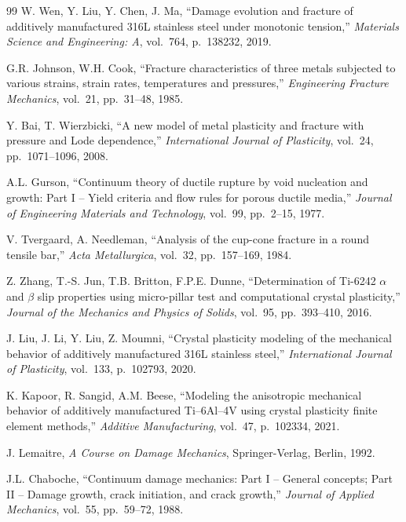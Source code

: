 \documentclass[twocolumn]{sagej}
\begin{document}
\begin{thebibliography}{99}
W. Wen, Y. Liu, Y. Chen, J. Ma, ``Damage evolution and fracture of additively manufactured 316L stainless steel under monotonic tension,'' \textit{Materials Science and Engineering: A}, vol.~764, p.~138232, 2019.

G.R. Johnson, W.H. Cook, ``Fracture characteristics of three metals subjected to various strains, strain rates, temperatures and pressures,'' \textit{Engineering Fracture Mechanics}, vol.~21, pp.~31--48, 1985.

Y. Bai, T. Wierzbicki, ``A new model of metal plasticity and fracture with pressure and Lode dependence,'' \textit{International Journal of Plasticity}, vol.~24, pp.~1071--1096, 2008.

A.L. Gurson, ``Continuum theory of ductile rupture by void nucleation and growth: Part I -- Yield criteria and flow rules for porous ductile media,'' \textit{Journal of Engineering Materials and Technology}, vol.~99, pp.~2--15, 1977.

V. Tvergaard, A. Needleman, ``Analysis of the cup-cone fracture in a round tensile bar,'' \textit{Acta Metallurgica}, vol.~32, pp.~157--169, 1984.

Z. Zhang, T.-S. Jun, T.B. Britton, F.P.E. Dunne, ``Determination of Ti-6242 $\alpha$ and $\beta$ slip properties using micro-pillar test and computational crystal plasticity,'' \textit{Journal of the Mechanics and Physics of Solids}, vol.~95, pp.~393--410, 2016.

J. Liu, J. Li, Y. Liu, Z. Moumni, ``Crystal plasticity modeling of the mechanical behavior of additively manufactured 316L stainless steel,'' \textit{International Journal of Plasticity}, vol.~133, p.~102793, 2020.

K. Kapoor, R. Sangid, A.M. Beese, ``Modeling the anisotropic mechanical behavior of additively manufactured Ti--6Al--4V using crystal plasticity finite element methods,'' \textit{Additive Manufacturing}, vol.~47, p.~102334, 2021.

J. Lemaitre, \textit{A Course on Damage Mechanics}, Springer-Verlag, Berlin, 1992.

J.L. Chaboche, ``Continuum damage mechanics: Part I -- General concepts; Part II -- Damage growth, crack initiation, and crack growth,'' \textit{Journal of Applied Mechanics}, vol.~55, pp.~59--72, 1988.


\end{thebibliography}
\end{document}
